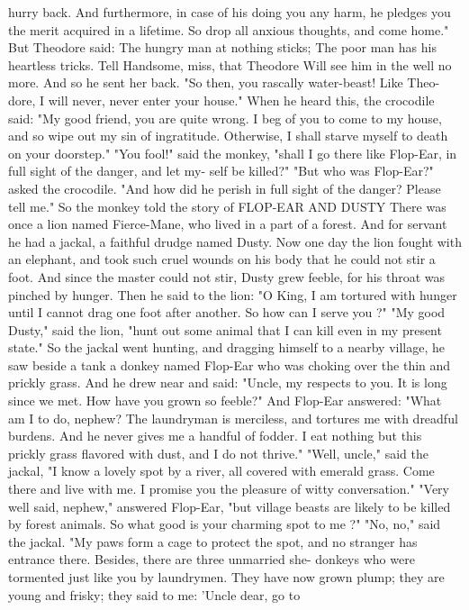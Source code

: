 \documentclass{book}
\begin{document}
hurry back. And furthermore, in case of his doing
you any harm, he pledges you the merit acquired in a
lifetime. So drop all anxious thoughts, and come
home." But Theodore said:
The hungry man at nothing sticks;
The poor man has his heartless tricks.
Tell Handsome, miss, that Theodore
Will see him in the well no more.
And so he sent her back.
"So then, you rascally water-beast! Like Theo-
dore, I will never, never enter your house."
When he heard this, the crocodile said: "My good
friend, you are quite wrong. I beg of you to come to
my house, and so wipe out my sin of ingratitude.
Otherwise, I shall starve myself to death on your
doorstep."
"You fool!" said the monkey, "shall I go there
like Flop-Ear, in full sight of the danger, and let my-
self be killed?"
"But who was Flop-Ear?" asked the crocodile.
"And how did he perish in full sight of the danger?
Please tell me." So the monkey told the story of
FLOP-EAR AND DUSTY
There was once a lion named Fierce-Mane, who
lived in a part of a forest. And for servant he had a
jackal, a faithful drudge named Dusty.
Now one day the lion fought with an elephant,
and took such cruel wounds on his body that he
could not stir a foot. And since the master could not
stir, Dusty grew feeble, for his throat was pinched by
hunger. Then he said to the lion: "O King, I am
tortured with hunger until I cannot drag one foot
after another. So how can I serve you ?" "My good
Dusty," said the lion, "hunt out some animal that
I can kill even in my present state."
So the jackal went hunting, and dragging himself
to a nearby village, he saw beside a tank a donkey
named Flop-Ear who was choking over the thin and
prickly grass. And he drew near and said: "Uncle,
my respects to you. It is long since we met. How
have you grown so feeble?"
And Flop-Ear answered: "What am I to do,
nephew? The laundryman is merciless, and tortures
me with dreadful burdens. And he never gives me a
handful of fodder. I eat nothing but this prickly
grass flavored with dust, and I do not thrive."
"Well, uncle," said the jackal, "I know a lovely
spot by a river, all covered with emerald grass. Come
there and live with me. I promise you the pleasure
of witty conversation."
"Very well said, nephew," answered Flop-Ear,
"but village beasts are likely to be killed by forest
animals. So what good is your charming spot to me ?"
"No, no," said the jackal. "My paws form a
cage to protect the spot, and no stranger has entrance
there. Besides, there are three unmarried she-
donkeys who were tormented just like you by
laundrymen. They have now grown plump; they are
young and frisky; they said to me: 'Uncle dear, go to
\end{document}
